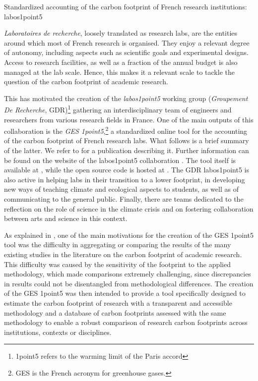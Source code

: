 \documentclass[../SustainableHEP.tex]{subfiles}
\begin{document}
\begin{bestpractice}
{Standardized accounting
of the carbon footprint of French research 
institutions: labos1point5}

\emph{Laboratoires de recherche}, loosely translated as research labs,
are the entities around which most of French research is organised.
They enjoy a relevant degree of autonomy, including 
aspects such as scientific goals and experimental designs. 
Access to research facilities, as well as 
a fraction of the annual budget is also managed at the lab scale.
Hence, this makes it a relevant scale to tackle the question 
of the carbon footprint of academic research. 

This has motivated the creation of the \emph{labos1point5} 
working group (\emph{Groupement De Recherche}, GDR)\footnote{1point5
refers to the warming limit of the Paris accord} 
gathering an interdisciplinary team of engineers and researchers from various research fields in France. 
One of the main outputs of this collaboration is the \emph{GES 1point5},\footnote{GES
is the French acronym for greenhouse gases.} a
standardized online tool for the accounting of the carbon 
footprint of French research labs. What follows is a brief
summary of the latter. We refer to \cite{labos1p5}
for a publication describing it. Further information 
can be found on the website of the labos1point5 collaboration 
\cite{labos1p5web}. The tool itself is available at \cite{ges1p5}, 
while the open source code is hosted at \cite{ges1p5git}.
The GDR labos1point5 is also active in helping labs in their
transition to a lower footprint, in developing new ways of 
teaching climate and ecological aspects to students, as well
as of communicating to the general public. Finally,
there are  teams dedicated to the reflection on the role
of science in the climate crisis and on fostering collaboration 
between arts and science in this context.

As explained in \cite{labos1p5}, one of the main motivations for the 
creation of the GES 1point5 tool was the difficulty in aggregating or comparing the results of 
the many existing studies in the literature on the carbon footprint of academic research.
This difficulty was caused by the sensitivity of the footprint to the applied 
methodology, which made comparisons extremely challenging, since discrepancies in results
could not be disentangled from methodological differences. 
The creation of the GES 1point5 was then intended to provide 
a tool specifically designed to estimate the carbon footprint of research with a transparent
and accessible methodology and a database of carbon footprints assessed with the same
methodology to enable a robust comparison of research carbon footprints across institutions,
contexts or disciplines.


\end{bestpractice}
\end{document}
